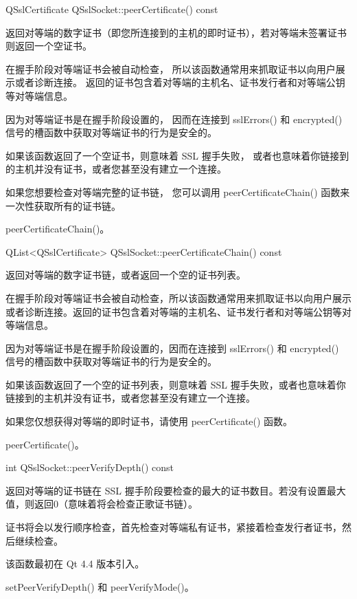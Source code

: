 QSslCertificate QSslSocket::peerCertificate() const

返回对等端的数字证书（即您所连接到的主机的即时证书），若对等端未签署证书则返回一个空证书。

在握手阶段对等端证书会被自动检查，
所以该函数通常用来抓取证书以向用户展示或者诊断连接。
返回的证书包含着对等端的主机名、证书发行者和对等端公钥等对等端信息。

因为对等端证书是在握手阶段设置的，
因而在连接到 sslErrors() 和 encrypted() 信号的槽函数中获取对等端证书的行为是安全的。

如果该函数返回了一个空证书，则意味着 SSL 握手失败，
或者也意味着你链接到的主机并没有证书，或者您甚至没有建立一个连接。

如果您想要检查对等端完整的证书链，
您可以调用 peerCertificateChain() 函数来一次性获取所有的证书链。

\begin{notice}
peerCertificateChain()。
\end{notice}

QList<QSslCertificate> QSslSocket::peerCertificateChain() const

返回对等端的数字证书链，或者返回一个空的证书列表。

在握手阶段对等端证书会被自动检查，所以该函数通常用来抓取证书以向用户展示或者诊断连接。返回的证书包含着对等端的主机名、证书发行者和对等端公钥等对等端信息。

因为对等端证书是在握手阶段设置的，因而在连接到 sslErrors() 和 encrypted() 信号的槽函数中获取对等端证书的行为是安全的。

如果该函数返回了一个空的证书列表，则意味着 SSL 握手失败，或者也意味着你链接到的主机并没有证书，或者您甚至没有建立一个连接。

如果您仅想获得对等端的即时证书，请使用 peerCertificate() 函数。

\begin{notice}
peerCertificate()。
\end{notice}

int QSslSocket::peerVerifyDepth() const

返回对等端的证书链在 SSL 握手阶段要检查的最大的证书数目。若没有设置最大值，则返回0（意味着将会检查正歌证书链）。

证书将会以发行顺序检查，首先检查对等端私有证书，紧接着检查发行者证书，然后继续检查。

该函数最初在 Qt 4.4 版本引入。

\begin{notice}
setPeerVerifyDepth() 和 peerVerifyMode()。
\end{notice}

